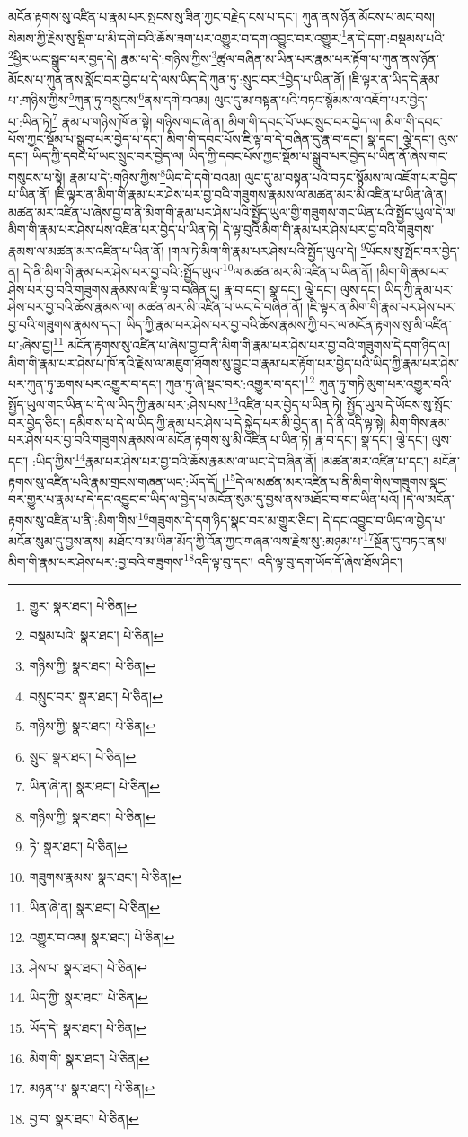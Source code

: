 མངོན་རྟགས་སུ་འཛིན་པ་རྣམ་པར་སྤངས་སུ་ཟིན་ཀྱང་བརྗེད་ངས་པ་དང་། ཀུན་ནས་ཉོན་མོངས་པ་མང་བས། སེམས་ཀྱི་རྗེས་སུ་སྡིག་པ་མི་དགེ་བའི་ཆོས་ཟག་པར་འགྱུར་བ་དག་འབྱུང་བར་འགྱུར་\footnote{གྱུར་  སྣར་ཐང་།  པེ་ཅིན། }ན་དེ་དག་:བསྡམས་པའི་\footnote{བསྡམ་པའི་  སྣར་ཐང་།  པེ་ཅིན། }ཕྱིར་ཡང་སྒྲུབ་པར་བྱད་དེ། རྣམ་པ་དེ་:གཉིས་ཀྱིས་\footnote{གཉིས་ཀྱི་  སྣར་ཐང་།  པེ་ཅིན། }ཚུལ་བཞིན་མ་ཡིན་པར་རྣམ་པར་རྟོག་པ་ཀུན་ནས་ཉོན་མོངས་པ་ཀུན་ནས་སློང་བར་བྱེད་པ་དེ་ལས་ཡིད་དེ་ཀུན་ཏུ་:སྲུང་བར་\footnote{བསྲུང་བར་  སྣར་ཐང་།  པེ་ཅིན། }བྱེད་པ་ཡིན་ནོ། །ཇི་ལྟར་ན་ཡིད་དེ་རྣམ་པ་:གཉིས་ཀྱིས་\footnote{གཉིས་ཀྱི་  སྣར་ཐང་།  པེ་ཅིན། }ཀུན་ཏུ་བསྲུངས་\footnote{སྲུང་  སྣར་ཐང་།  པེ་ཅིན། }ནས་དགེ་བའམ། ལུང་དུ་མ་བསྟན་པའི་བཏང་སྙོམས་ལ་འཇོག་པར་བྱེད་པ་:ཡིན་ཏེ།\footnote{ཡིན་ཞེ་ན།  སྣར་ཐང་།  པེ་ཅིན། } རྣམ་པ་གཉིས་ཁོ་ན་སྟེ། གཉིས་གང་ཞེ་ན། མིག་གི་དབང་པོ་ཡང་སྲུང་བར་བྱེད་ལ། མིག་གི་དབང་པོས་ཀྱང་སྡོམ་པ་སྒྲུབ་པར་བྱེད་པ་དང་། མིག་གི་དབང་པོས་ཇི་ལྟ་བ་དེ་བཞིན་དུ་རྣ་བ་དང་། སྣ་དང་། ལྕེ་དང་། ལུས་དང་། ཡིད་ཀྱི་དབང་པོ་ཡང་སྲུང་བར་བྱེད་ལ། ཡིད་ཀྱི་དབང་པོས་ཀྱང་སྡོམ་པ་སྒྲུབ་པར་བྱེད་པ་ཡིན་ནོ་ཞེས་གང་གསུངས་པ་སྟེ། རྣམ་པ་དེ་:གཉིས་ཀྱིས་\footnote{གཉིས་ཀྱི་  སྣར་ཐང་།  པེ་ཅིན། }ཡིད་དེ་དགེ་བའམ། ལུང་དུ་མ་བསྟན་པའི་བཏང་སྙོམས་ལ་འཇོག་པར་བྱེད་པ་ཡིན་ནོ། །ཇི་ལྟར་ན་མིག་གི་རྣམ་པར་ཤེས་པར་བྱ་བའི་གཟུགས་རྣམས་ལ་མཚན་མར་མི་འཛིན་པ་ཡིན་ཞེ་ན། མཚན་མར་འཛིན་པ་ཞེས་བྱ་བ་ནི་མིག་གི་རྣམ་པར་ཤེས་པའི་སྤྱོད་ཡུལ་གྱི་གཟུགས་གང་ཡིན་པའི་སྤྱོད་ཡུལ་དེ་ལ། མིག་གི་རྣམ་པར་ཤེས་པས་འཛིན་པར་བྱེད་པ་ཡིན་ཏེ། དེ་ལྟ་བུའི་མིག་གི་རྣམ་པར་ཤེས་པར་བྱ་བའི་གཟུགས་རྣམས་ལ་མཚན་མར་འཛིན་པ་ཡིན་ནོ། །གལ་ཏེ་མིག་གི་རྣམ་པར་ཤེས་པའི་སྤྱོད་ཡུལ་དེ། \footnote{ཏེ་  སྣར་ཐང་།  པེ་ཅིན། }ཡོངས་སུ་སྤོང་བར་བྱེད་ན། དེ་ནི་མིག་གི་རྣམ་པར་ཤེས་པར་བྱ་བའི་:སྤྱོད་ཡུལ་\footnote{གཟུགས་རྣམས་  སྣར་ཐང་།  པེ་ཅིན། }ལ་མཚན་མར་མི་འཛིན་པ་ཡིན་ནོ། །མིག་གི་རྣམ་པར་ཤེས་པར་བྱ་བའི་གཟུགས་རྣམས་ལ་ཇི་ལྟ་བ་བཞིན་དུ། རྣ་བ་དང་། སྣ་དང་། ལྕེ་དང་། ལུས་དང་། ཡིད་ཀྱི་རྣམ་པར་ཤེས་པར་བྱ་བའི་ཆོས་རྣམས་ལ། མཚན་མར་མི་འཛིན་པ་ཡང་དེ་བཞིན་ནོ། །ཇི་ལྟར་ན་མིག་གི་རྣམ་པར་ཤེས་པར་བྱ་བའི་གཟུགས་རྣམས་དང་། ཡིད་ཀྱི་རྣམ་པར་ཤེས་པར་བྱ་བའི་ཆོས་རྣམས་ཀྱི་བར་ལ་མངོན་རྟགས་སུ་མི་འཛིན་པ་:ཞེས་བྱ།\footnote{ཡིན་ཞེ་ན།  སྣར་ཐང་།  པེ་ཅིན། } མངོན་རྟགས་སུ་འཛིན་པ་ཞེས་བྱ་བ་ནི་མིག་གི་རྣམ་པར་ཤེས་པར་བྱ་བའི་གཟུགས་དེ་དག་ཉིད་ལ། མིག་གི་རྣམ་པར་ཤེས་པ་ཁོ་ནའི་རྗེས་ལ་མཇུག་ཐོགས་སུ་བྱུང་བ་རྣམ་པར་རྟོག་པར་བྱེད་པའི་ཡིད་ཀྱི་རྣམ་པར་ཤེས་པར་ཀུན་ཏུ་ཆགས་པར་འགྱུར་བ་དང་། ཀུན་ཏུ་ཞེ་སྡང་བར་:འགྱུར་བ་དང་།\footnote{འགྱུར་བ་འམ།  སྣར་ཐང་།  པེ་ཅིན། } ཀུན་ཏུ་གཏི་མུག་པར་འགྱུར་བའི་སྤྱོད་ཡུལ་གང་ཡིན་པ་དེ་ལ་ཡིད་ཀྱི་རྣམ་པར་:ཤེས་པས་\footnote{ཤེས་པ་  སྣར་ཐང་།  པེ་ཅིན། }འཛིན་པར་བྱེད་པ་ཡིན་ཏེ། སྤྱོད་ཡུལ་དེ་ཡོངས་སུ་སྤོང་བར་བྱེད་ཅིང་། དམིགས་པ་དེ་ལ་ཡིད་ཀྱི་རྣམ་པར་ཤེས་པ་དེ་སྐྱེད་པར་མི་བྱེད་ན། དེ་ནི་འདི་ལྟ་སྟེ། མིག་གིས་རྣམ་པར་ཤེས་པར་བྱ་བའི་གཟུགས་རྣམས་ལ་མངོན་རྟགས་སུ་མི་འཛིན་པ་ཡིན་ཏེ། རྣ་བ་དང་། སྣ་དང་། ལྕེ་དང་། ལུས་དང་། :ཡིད་ཀྱིས་\footnote{ཡིད་ཀྱི་  སྣར་ཐང་།  པེ་ཅིན། }རྣམ་པར་ཤེས་པར་བྱ་བའི་ཆོས་རྣམས་ལ་ཡང་དེ་བཞིན་ནོ། །མཚན་མར་འཛིན་པ་དང་། མངོན་རྟགས་སུ་འཛིན་པའི་རྣམ་གྲངས་གཞན་ཡང་:ཡོད་དོ། །\footnote{ཡོད་དེ་  སྣར་ཐང་།  པེ་ཅིན། }དེ་ལ་མཚན་མར་འཛིན་པ་ནི་མིག་གིས་གཟུགས་སྣང་བར་གྱུར་པ་རྣམ་པ་དེ་དང་འབྱུང་བ་ཡིད་ལ་བྱེད་པ་མངོན་སུམ་དུ་བྱས་ནས་མཐོང་བ་གང་ཡིན་པའོ། །དེ་ལ་མངོན་རྟགས་སུ་འཛིན་པ་ནི་:མིག་གིས་\footnote{མིག་གི་  སྣར་ཐང་།  པེ་ཅིན། }གཟུགས་དེ་དག་ཉིད་སྣང་བར་མ་གྱུར་ཅིང་། དེ་དང་འབྱུང་བ་ཡིད་ལ་བྱེད་པ་མངོན་སུམ་དུ་བྱས་ནས། མཐོང་བ་མ་ཡིན་མོད་ཀྱི་འོན་ཀྱང་གཞན་ལས་རྗེས་སུ་:མཉམ་པ་\footnote{མཉན་པ་  སྣར་ཐང་།  པེ་ཅིན། }སྔོན་དུ་བཏང་ནས། མིག་གི་རྣམ་པར་ཤེས་པར་:བྱ་བའི་གཟུགས་\footnote{བྱ་བ་  སྣར་ཐང་།  པེ་ཅིན། }འདི་ལྟ་བུ་དང་། འདི་ལྟ་བུ་དག་ཡོད་དོ་ཞེས་ཐོས་ཤིང་། 